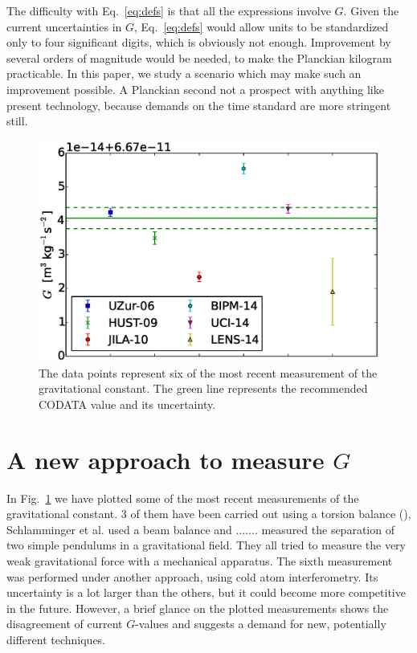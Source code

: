 \documentclass[prb,preprint]{revtex4-1}
\begin{document}
The difficulty with Eq.~\eqref{eq:defs} is that all the expressions
involve $G$.  Given the current uncertainties in $G$,
Eq.~\eqref{eq:defs} would allow units to be standardized only to four
significant digits, which is obviously not enough.  Improvement by
several orders of magnitude would be needed, to make the Planckian
kilogram practicable.  In this paper, we study a scenario which may
make such an improvement possible.  A Planckian second not a prospect
with anything like present technology, because demands on the time
standard are more stringent still.\\




\begin{figure}
	\centering
	\includegraphics[width=\textwidth]{img/plotGmeas}
	\caption{The data points represent six of the most recent measurement of the gravitational constant. The green line represents the recommended CODATA value and its uncertainty.}
	\label{fig:Gmeasurements}
\end{figure}

\section{A new approach to measure $G$}

In Fig.~\ref{fig:Gmeasurements} we have plotted some of the most recent measurements of the gravitational constant. 3 of them have been carried out using a torsion balance (), Schlamminger et al. used a beam balance and ....... measured the separation of two simple pendulums in a gravitational field. They all tried to measure the very weak gravitational force with a mechanical apparatus. The sixth measurement was performed under another approach, using cold atom interferometry. Its uncertainty is a lot larger than the others, but it could become more competitive in the future. However, a brief glance on the plotted measurements shows the disagreement of current $G$-values and suggests a demand for new, potentially different techniques.\\ 
\end{document}
